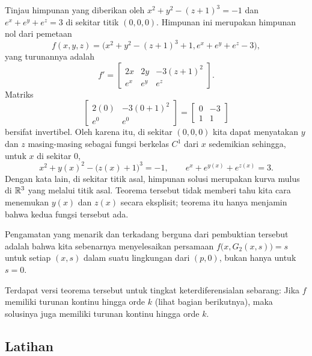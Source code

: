 \begin{example}
Tinjau himpunan yang diberikan oleh $x^2+y^2-{(z+1)}^3 = -1$ dan $e^x+e^y+e^z = 3$
di sekitar titik $(0,0,0)$.
Himpunan ini merupakan himpunan nol dari pemetaan
\begin{equation*}
f(x,y,z) = \bigl(x^2+y^2-{(z+1)}^3+1,e^x+e^y+e^z-3\bigr) ,
\end{equation*}
yang turunannya adalah
\begin{equation*}
f' =
\begin{bmatrix}
2x & 2y & -3{(z+1)}^2 \\
e^x & e^y & e^z
\end{bmatrix} .
\end{equation*}
Matriks
\begin{equation*}
\begin{bmatrix}
2(0) & -3{(0+1)}^2 \\
e^0 & e^0
\end{bmatrix}
=
\begin{bmatrix}
0 & -3 \\
1 & 1
\end{bmatrix}
\end{equation*}
bersifat invertibel.  Oleh karena itu, di sekitar $(0,0,0)$ kita dapat menyatakan $y$ dan $z$
masing-masing sebagai fungsi berkelas $C^1$ dari $x$ sedemikian sehingga, untuk $x$ di sekitar $0$,
\begin{equation*}
x^2+y(x)^2-{\bigl(z(x)+1\bigr)}^3 = -1,
\qquad
e^x+e^{y(x)}+e^{z(x)} = 3 .
\end{equation*}
Dengan kata lain, di sekitar titik asal, himpunan solusi merupakan
kurva mulus di ${\mathbb{R}}^3$ yang melalui titik asal.
Teorema tersebut tidak memberi tahu kita cara menemukan $y(x)$ dan $z(x)$ secara eksplisit;
teorema itu hanya menjamin bahwa kedua fungsi tersebut ada.
\end{example}

Pengamatan yang menarik dan terkadang berguna dari pembuktian tersebut adalah bahwa kita sebenarnya menyelesaikan persamaan
$f\bigl(x,G_2(x,s)\bigr) = s$ untuk setiap $(x,s)$ dalam suatu lingkungan dari $(p,0)$, bukan hanya
untuk $s=0$.

\begin{remark}
Terdapat versi teorema tersebut untuk tingkat keterdiferensialan sebarang:
Jika $f$ memiliki turunan kontinu hingga orde $k$ (lihat bagian berikutnya), maka solusinya juga memiliki
turunan kontinu hingga orde $k$.
\end{remark}


\subsection{Latihan}

